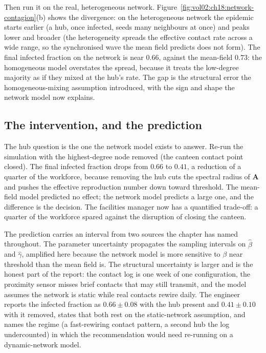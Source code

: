 Then run it on the real, heterogeneous network.
Figure~\ref{fig:vol02:ch18:network-contagion}(b) shows the divergence: on
the heterogeneous network the epidemic starts earlier (a hub, once
infected, seeds many neighbours at once) and peaks lower and broader (the
heterogeneity spreads the effective contact rate across a wide range, so
the synchronised wave the mean field predicts does not form). The final
infected fraction on the network is near $0.66$, against the mean-field
$0.73$: the homogeneous model overstates the spread, because it treats the
low-degree majority as if they mixed at the hub's rate. The gap is the
structural error the homogeneous-mixing assumption introduced, with the
sign and shape the network model now explains.

\subsection{The intervention, and the prediction}

The hub question is the one the network model exists to answer. Re-run the
simulation with the highest-degree node removed (the canteen contact point
closed). The final infected fraction drops from $0.66$ to $0.41$, a
reduction of a quarter of the workforce, because removing the hub cuts the
spectral radius of $\mathbf{A}$ and pushes the effective reproduction
number down toward threshold. The mean-field model predicted no effect; the
network model predicts a large one, and the difference is the decision. The
facilities manager now has a quantified trade-off: a quarter of the
workforce spared against the disruption of closing the canteen.

The prediction carries an interval from two sources the chapter has named
throughout. The parameter uncertainty propagates the sampling intervals on
$\hat\beta$ and $\hat\gamma$, amplified here because the network model is
more sensitive to $\beta$ near threshold than the mean field is. The
structural uncertainty is larger and is the honest part of the report: the
contact log is one week of one configuration, the proximity sensor misses
brief contacts that may still transmit, and the model assumes the network
is static while real contacts rewire daily. The engineer reports the
infected fraction as $0.66 \pm 0.08$ with the hub present and $0.41 \pm
0.10$ with it removed, states that both rest on the static-network
assumption, and names the regime (a fast-rewiring contact pattern, a
second hub the log undercounted) in which the recommendation would need
re-running on a dynamic-network model.

